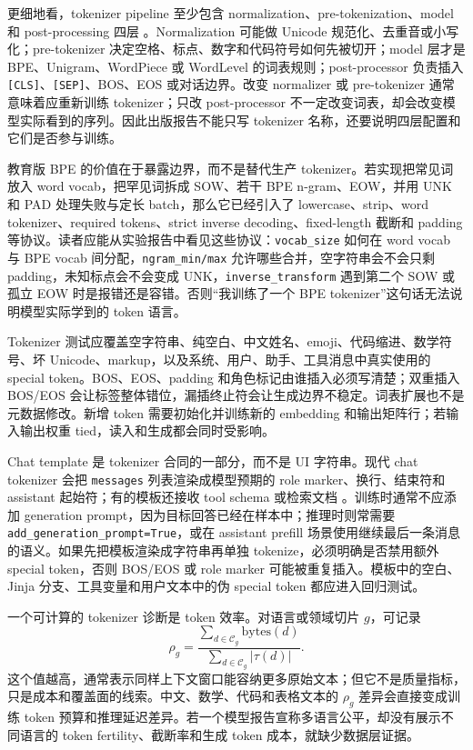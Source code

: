 \documentclass[UTF8,zihao=-4,openany]{ctexbook}
\begin{document}
更细地看，tokenizer pipeline 至少包含 normalization、pre-tokenization、model 和 post-processing 四层 \cite{huggingface2026tokenizerspipeline}。Normalization 可能做 Unicode 规范化、去重音或小写化；pre-tokenizer 决定空格、标点、数字和代码符号如何先被切开；model 层才是 BPE、Unigram、WordPiece 或 WordLevel 的词表规则；post-processor 负责插入 \texttt{[CLS]}、\texttt{[SEP]}、BOS、EOS 或对话边界。改变 normalizer 或 pre-tokenizer 通常意味着应重新训练 tokenizer；只改 post-processor 不一定改变词表，却会改变模型实际看到的序列。因此出版报告不能只写 tokenizer 名称，还要说明四层配置和它们是否参与训练。

教育版 BPE 的价值在于暴露边界，而不是替代生产 tokenizer。若实现把常见词放入 word vocab，把罕见词拆成 SOW、若干 BPE n-gram、EOW，并用 UNK 和 PAD 处理失败与定长 batch，那么它已经引入了 lowercase、strip、word tokenizer、required tokens、strict inverse decoding、fixed-length 截断和 padding 等协议。读者应能从实验报告中看见这些协议：\texttt{vocab\_size} 如何在 word vocab 与 BPE vocab 间分配，\texttt{ngram\_min/max} 允许哪些合并，空字符串会不会只剩 padding，未知标点会不会变成 UNK，\texttt{inverse\_transform} 遇到第二个 SOW 或孤立 EOW 时是报错还是容错。否则“我训练了一个 BPE tokenizer”这句话无法说明模型实际学到的 token 语言。

Tokenizer 测试应覆盖空字符串、纯空白、中文姓名、emoji、代码缩进、数学符号、坏 Unicode、markup，以及系统、用户、助手、工具消息中真实使用的 special token。BOS、EOS、padding 和角色标记由谁插入必须写清楚；双重插入 BOS/EOS 会让标签整体错位，漏插终止符会让生成边界不稳定。词表扩展也不是元数据修改。新增 token 需要初始化并训练新的 embedding 和输出矩阵行；若输入输出权重 tied，读入和生成都会同时受影响。

Chat template 是 tokenizer 合同的一部分，而不是 UI 字符串。现代 chat tokenizer 会把 \texttt{messages} 列表渲染成模型预期的 role marker、换行、结束符和 assistant 起始符；有的模板还接收 tool schema 或检索文档 \cite{huggingface2026chattemplates}。训练时通常不应添加 generation prompt，因为目标回答已经在样本中；推理时则常需要 \texttt{add\_generation\_prompt=True}，或在 assistant prefill 场景使用继续最后一条消息的语义。如果先把模板渲染成字符串再单独 tokenize，必须明确是否禁用额外 special token，否则 BOS/EOS 或 role marker 可能被重复插入。模板中的空白、Jinja 分支、工具变量和用户文本中的伪 special token 都应进入回归测试。

一个可计算的 tokenizer 诊断是 token 效率。对语言或领域切片 $g$，可记录
\[
\rho_g=\frac{\sum_{d\in \mathcal{C}_g}\mathrm{bytes}(d)}
{\sum_{d\in \mathcal{C}_g}|\tau(d)|}.
\]
这个值越高，通常表示同样上下文窗口能容纳更多原始文本；但它不是质量指标，只是成本和覆盖面的线索。中文、数学、代码和表格文本的 $\rho_g$ 差异会直接变成训练 token 预算和推理延迟差异。若一个模型报告宣称多语言公平，却没有展示不同语言的 token fertility、截断率和生成 token 成本，就缺少数据层证据。
\end{document}
